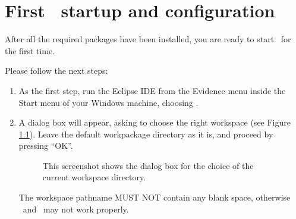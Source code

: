 \chapter{First \rtd\ startup and configuration}

After all the required packages have been installed, you are ready to
start \rtd\ for the first time.

Please follow the next steps:

\begin{enumerate}
\item As the first step, run the Eclipse IDE from the Evidence menu
  inside the Start menu of your Windows machine, choosing 
  .
  
\item A dialog box will appear, asking to choose the right
  workspace (see Figure \ref{fig:select-workspace}). 
  Leave the default workpackage directory
  as it is, and proceed by pressing ``OK''.
%
\begin{figure}[htb]
\caption{This screenshot shows the
dialog box for the choice of the current workspace directory.}
\label{fig:select-workspace}
\end{figure}

\begin{warning}
The workspace pathname MUST NOT contain any blank space, otherwise 
\ee\ and \rtd\ may not work properly.
\end{warning}



\end{enumerate}
